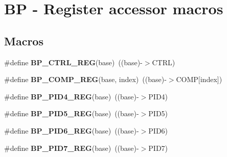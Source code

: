 \hypertarget{group___b_p___register___accessor___macros}{}\section{BP -\/ Register accessor macros}
\label{group___b_p___register___accessor___macros}
\subsection*{Macros}
\begin{DoxyCompactItemize}
\item 
\mbox{\label{group___b_p___register___accessor___macros_ga263ad2de73c59882ef32b979fbdf85ec}} 
\#define {\bfseries B\+P\+\_\+\+C\+T\+R\+L\+\_\+\+R\+EG}(base)~((base)-\/$>$C\+T\+RL)
\item 
\mbox{\label{group___b_p___register___accessor___macros_gaa003734bc6b716d1723b103a68d560ba}} 
\#define {\bfseries B\+P\+\_\+\+C\+O\+M\+P\+\_\+\+R\+EG}(base,  index)~((base)-\/$>$C\+O\+MP\mbox{[}index\mbox{]})
\item 
\mbox{\label{group___b_p___register___accessor___macros_ga28db243373ee0ff2f420aca1d10355af}} 
\#define {\bfseries B\+P\+\_\+\+P\+I\+D4\+\_\+\+R\+EG}(base)~((base)-\/$>$P\+I\+D4)
\item 
\mbox{\label{group___b_p___register___accessor___macros_ga2345dbb37bdbd60923585d262577046e}} 
\#define {\bfseries B\+P\+\_\+\+P\+I\+D5\+\_\+\+R\+EG}(base)~((base)-\/$>$P\+I\+D5)
\item 
\mbox{\label{group___b_p___register___accessor___macros_ga66703003db17abee9bb72bd7ffcd9c35}} 
\#define {\bfseries B\+P\+\_\+\+P\+I\+D6\+\_\+\+R\+EG}(base)~((base)-\/$>$P\+I\+D6)
\item 
\mbox{\label{group___b_p___register___accessor___macros_gaf7dbebc14a63b88e16cbef163a2f4f45}} 
\#define {\bfseries B\+P\+\_\+\+P\+I\+D7\+\_\+\+R\+EG}(base)~((base)-\/$>$P\+I\+D7)
\item 

\end{DoxyCompactItemize}
